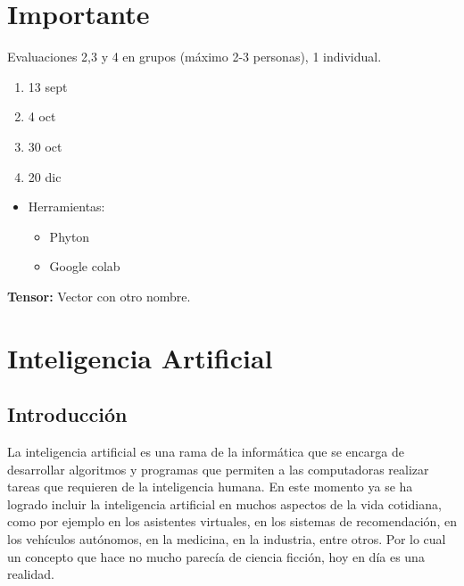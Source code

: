 \documentclass{templateNote}
\begin{document}


\portada
\margenes 
\tableofcontents
\newpage



\section{Importante}
Evaluaciones 2,3 y 4 en grupos (máximo 2-3 personas), 1 individual.

\begin{enumerate}
    \item 13 sept
    \item 4 oct
    \item 30 oct
    \item 20 dic
\end{enumerate}

\begin{itemize}
    \item Herramientas:
    \begin{itemize}
        \item Phyton
        \item Google colab
    \end{itemize}
\end{itemize}

\textbf{Tensor:} Vector con otro nombre.

\newpage
\section{Inteligencia Artificial}
\subsection{Introducción}
La inteligencia artificial es una rama de la informática que se encarga de desarrollar algoritmos y programas que permiten a las computadoras realizar tareas que requieren de la inteligencia humana. En este momento ya se ha logrado incluir la inteligencia artificial en muchos aspectos de la vida cotidiana, como por ejemplo en los asistentes virtuales, en los sistemas de recomendación, en los vehículos autónomos, en la medicina, en la industria, entre otros. Por lo cual un concepto que hace no mucho parecía de ciencia ficción, hoy en día es una realidad.
\end{document}
